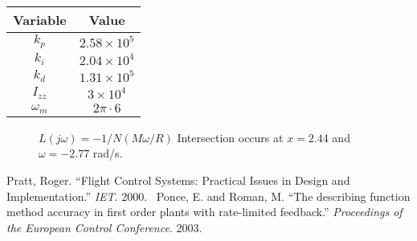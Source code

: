 \documentclass{article} %
\begin{document}
\begin{table}
\begin{center}
\begin{tabular}{cc}
\hline
\hline
Variable & Value \\
\hline
$k_p$ & $2.58 \times 10^5$ \\
$k_i$ & $2.04 \times 10^4$ \\
$k_d$ & $1.31 \times 10^5$ \\
$I_{zz}$ & $3 \times 10^4$ \\
$\omega_m$ & $2 \pi \cdot 6$ \\
\hline
\hline
\end{tabular}
\end{center}
\end{table}

\begin{figure}[!ht]
\begin{center}
\caption{$L(j \omega) = -1 / N(M \omega / R)$ Intersection occurs at $x = 2.44$ and
  $\omega = -2.77$ rad/s.}
\label{fig:rlocus}
\end{center}
\end{figure}


\begin{thebibliography}{1}
 Pratt, Roger. ``Flight Control Systems: Practical Issues in
  Design and Implementation.'' {\it IET}. 2000.\
 Ponce, E. and Roman, M. ``The describing function
  method accuracy in first order plants with rate-limited feedback.''
  {\it Proceedings of the European Control Conference}. 2003.
\end{thebibliography}
\end{document}
